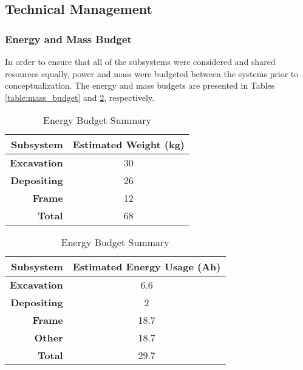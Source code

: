 \documentclass[class=article, crop=false]{standalone}
\begin{document}
	\subsection{Technical Management}
	\label{subsec:technical_management}
	
	\subsubsection{Energy and Mass Budget}
	In order to ensure that all of the subsystems were considered and shared resources equally, power and mass were budgeted between the systems prior to conceptualization. The energy and mass budgets are presented in Tables \ref{table:mass_budget} and \ref{table:energy_budget}, respectively.
	
\FloatBarrier
	\begin{table}[h]
	\scriptsize
	\parbox{.45\linewidth}{
	\centering
	\begin{tabular}{ | r | c | }
 	\hline		
 	\rowcolor[gray]{0.8}
 		\textbf{Subsystem} & \textbf{Estimated Weight (kg)} \\
 		\hline\hline
 		\textbf{Excavation} & 30 \\
 		\hline
 		\textbf{Depositing} & 26 \\
 		\hline
 		\textbf{Frame} & 12 \\
 		\hline
 		\textbf{Total} & 68 \\
 		\hline
	\end{tabular}
	\caption{Mass Budget Summary}
		\label{table:mass_budget}
	}
	\hfill
	\parbox{.45\linewidth}{
	\centering
	\begin{tabular}{ | r | c | }
 	\hline		
 	\rowcolor[gray]{0.8}
 		\textbf{Subsystem} & \textbf{Estimated Energy Usage (Ah)} \\
 		\hline\hline
 		\textbf{Excavation} & 6.6 \\
 		\hline
 		\textbf{Depositing} & 2 \\
 		\hline
 		\textbf{Frame} & 18.7 \\
 		\hline
 		\textbf{Other} & 18.7 \\
 		\hline
 		\textbf{Total} & 29.7 \\
 		\hline
	\end{tabular}
	\caption{Energy Budget Summary}
		\label{table:energy_budget}
	}
	\end{table}
	\FloatBarrier
	
\end{document}
